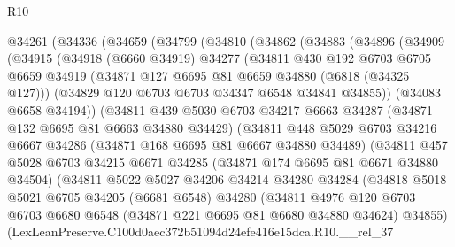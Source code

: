 \begin{lexlean}{R10}
\begin{coremodule}
  @34261
    (@34336
      (@34659
        (@34799
          (@34810
            (@34862
              (@34883
                (@34896
                  (@34909
                    (@34915
                      (@34918
                        (@6660 @34919)
                        @34277
                        (@34811
                          @430
                          @192
                          @6703
                          @6705
                          @6659
                          @34919
                          (@34871 @127 @6695 @81 @6659 @34880 (@6818 (@34325 @127)))
                          (@34829 @120 @6703 @6703 @34347 @6548 @34841 @34855))
                        (@34083 @6658 @34194))
                      (@34811
                        @439
                        @5030
                        @6703
                        @34217
                        @6663
                        @34287
                        (@34871 @132 @6695 @81 @6663 @34880 @34429)
                        (@34811
                          @448
                          @5029
                          @6703
                          @34216
                          @6667
                          @34286
                          (@34871 @168 @6695 @81 @6667 @34880 @34489)
                          (@34811
                            @457
                            @5028
                            @6703
                            @34215
                            @6671
                            @34285
                            (@34871 @174 @6695 @81 @6671 @34880 @34504)
                            (@34811
                              @5022
                              @5027
                              @34206
                              @34214
                              @34280
                              @34284
                              (@34818
                                @5018
                                @5021
                                @6705
                                @34205
                                (@6681 @6548)
                                @34280
                                (@34811
                                  @4976
                                  @120
                                  @6703
                                  @6703
                                  @6680
                                  @6548
                                  (@34871 @221 @6695 @81 @6680 @34880 @34624)
                                  @34855)
                                (LexLeanPreserve.C100d0aec372b51094d24efe416e15dca.R10.__rel_37

\end{coremodule}
\end{lexlean}
